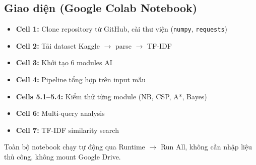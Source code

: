 \subsection{Giao diện (Google Colab Notebook)}

\begin{itemize}
  \item \textbf{Cell 1:} Clone repository từ GitHub, cài thư viện (\texttt{numpy}, \texttt{requests})
  \item \textbf{Cell 2:} Tải dataset Kaggle $\to$ parse $\to$ TF-IDF
  \item \textbf{Cell 3:} Khởi tạo 6 modules AI
  \item \textbf{Cell 4:} Pipeline tổng hợp trên input mẫu
  \item \textbf{Cells 5.1--5.4:} Kiểm thử từng module (NB, CSP, A*, Bayes)
  \item \textbf{Cell 6:} Multi-query analysis
  \item \textbf{Cell 7:} TF-IDF similarity search
\end{itemize}

Toàn bộ notebook chạy tự động qua Runtime $\to$ Run All, không cần nhập liệu thủ công, không mount Google Drive.
